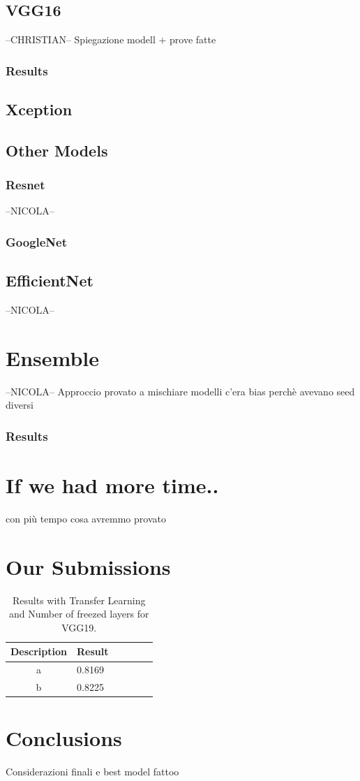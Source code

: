 \documentclass[10pt]{article}
\begin{document}
\subsection{VGG16}
--CHRISTIAN--
Spiegazione modell + prove fatte
\subsubsection{Results}
\subsection{Xception}

\subsection{Other Models}
\subsubsection{Resnet}
--NICOLA--
\subsubsection{GoogleNet}
\subsection{EfficientNet}
--NICOLA--



\section{Ensemble}
--NICOLA--
Approccio
provato a mischiare modelli
          c'era bias perchè avevano seed diversi
\subsubsection{Results}



\section{If we had more time..}
con più tempo cosa avremmo provato




\section{Our Submissions}
\begin{table}[ht]
\centering
\begin{adjustbox}{width=240}
\small
\begin{tabular}{|c|l|l|l|l|l}

\hline \bf Description & \bf Result \\ \hline
a & 0.8169 \\
b & 0.8225 \\

\hline
\end{tabular}
\end{adjustbox}
\caption{Results with Transfer Learning and Number of freezed layers for VGG19.}
\end{table}
\section{Conclusions}
Considerazioni finali e best model fattoo

\end{document}
